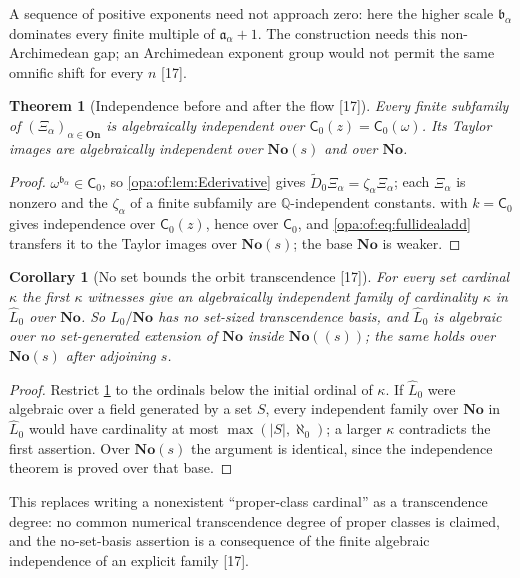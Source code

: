 \documentclass[11pt,oneside]{article}
\numberwithin{equation}{section}
\newtheorem{theorem}{Theorem}[section]
\newtheorem{corollary}[corollary]{Corollary}
\theoremstyle{definition}
\theoremstyle{remark}
\newcommand{\No}{\mathbf{No}}
\newcommand{\Q}{\mathbb Q}
\newcommand{\src}[1]{\textup{\textsf{\small[#1]}}}
\newcommand{\On}{\mathbf{On}}
\begin{document}
A sequence of positive exponents need not approach zero: here the higher scale $\mathfrak b_\alpha$ dominates every finite
multiple of $\mathfrak a_\alpha+1$. The construction needs this non-Archimedean gap; an Archimedean exponent group would not permit
the same omnific shift for every $n$ \src{17}.

\begin{theorem}[Independence before and after the flow \src{17}]\label{opa:of:thm:Xind}
Every finite subfamily of $(\Xi_\alpha)_{\alpha\in\On}$ is algebraically independent over $\mathsf C_0(z)=\mathsf C_0(\omega)$. Its
Taylor images are algebraically independent over $\No(s)$ and over $\No$.
\end{theorem}
\begin{proof}
$\omega^{\mathfrak b_\alpha}\in\mathsf C_0$, so \cref{opa:of:lem:Ederivative} gives $\widetilde D_0\Xi_\alpha=\zeta_\alpha\Xi_\alpha$; each $\Xi_\alpha$ is
nonzero and the $\zeta_\alpha$ of a finite subfamily are $\Q$-independent constants.  with $k=\mathsf C_0$ gives
independence over $\mathsf C_0(z)$, hence over $\mathsf C_0$, and \eqref{opa:of:eq:fullidealadd} transfers it to the Taylor images over
$\No(s)$; the base $\No$ is weaker.
\end{proof}

\begin{corollary}[No set bounds the orbit transcendence \src{17}]\label{opa:of:cor:unbounded}
For every set cardinal $\kappa$ the first $\kappa$ witnesses give an algebraically independent family of cardinality $\kappa$ in
$\widehat L_0$ over $\No$. So $\widehat L_0/\No$ has no set-sized transcendence basis, and $\widehat L_0$ is algebraic over no
set-generated extension of $\No$ inside $\No((s))$; the same holds over $\No(s)$ after adjoining $s$.
\end{corollary}
\begin{proof}
Restrict \cref{opa:of:thm:Xind} to the ordinals below the initial ordinal of $\kappa$. If $\widehat L_0$ were algebraic over a
field generated by a set $S$, every independent family over $\No$ in $\widehat L_0$ would have cardinality at most
$\max(|S|,\aleph_0)$; a larger $\kappa$ contradicts the first assertion. Over $\No(s)$ the argument is identical, since the
independence theorem is proved over that base.
\end{proof}

This replaces writing a nonexistent ``proper-class cardinal'' as a transcendence degree: no common numerical transcendence
degree of proper classes is claimed, and the no-set-basis assertion is a consequence of the finite algebraic independence
of an explicit family \src{17}.
\end{document}
